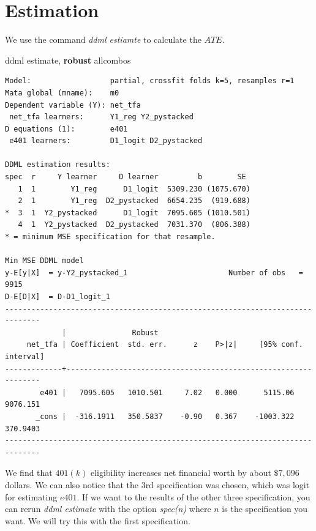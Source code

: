 \documentclass[
]{book}
\newenvironment{Shaded}{\begin{snugshade}}{\end{snugshade}}
\newcommand{\KeywordTok}[1]{\textcolor[rgb]{0.13,0.29,0.53}{\textbf{#1}}}
\newcommand{\NormalTok}[1]{#1}
\begin{document}
\section{Estimation}\label{estimation}

We use the command \emph{ddml estiamte} to calculate the \(ATE\).

\begin{Shaded}
\begin{Highlighting}[]
\NormalTok{ddml estimate, }\KeywordTok{robust}\NormalTok{ allcombos}
\end{Highlighting}
\end{Shaded}

\begin{verbatim}
Model:                  partial, crossfit folds k=5, resamples r=1
Mata global (mname):    m0
Dependent variable (Y): net_tfa
 net_tfa learners:      Y1_reg Y2_pystacked
D equations (1):        e401
 e401 learners:         D1_logit D2_pystacked

DDML estimation results:
spec  r     Y learner     D learner         b        SE 
   1  1        Y1_reg      D1_logit  5309.230 (1075.670)
   2  1        Y1_reg  D2_pystacked  6654.235  (919.688)
*  3  1  Y2_pystacked      D1_logit  7095.605 (1010.501)
   4  1  Y2_pystacked  D2_pystacked  7031.370  (806.388)
* = minimum MSE specification for that resample.

Min MSE DDML model
y-E[y|X]  = y-Y2_pystacked_1                       Number of obs   =      9915
D-E[D|X]  = D-D1_logit_1 
------------------------------------------------------------------------------
             |               Robust
     net_tfa | Coefficient  std. err.      z    P>|z|     [95% conf. interval]
-------------+----------------------------------------------------------------
        e401 |   7095.605   1010.501     7.02   0.000      5115.06    9076.151
       _cons |  -316.1911   350.5837    -0.90   0.367    -1003.322    370.9403
------------------------------------------------------------------------------
\end{verbatim}

We find that \(401(k)\) eligibility increases net financial worth by about \(\$7,096\) dollars. We can also notice that the 3rd specification was chosen, which was logit for estimating \(e401\). If we want to the results of the other three specification, you can rerun \emph{ddml estimate} with the option \emph{spec(n)} where \(n\) is the specification you want. We will try this with the first specification.
\end{document}

